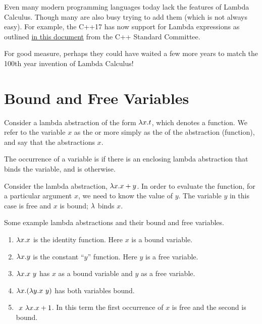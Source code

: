 \begin{note}
\label{nt:lce::syn::pl} 
Even many modern programming languages today lack the features of Lambda Calculus.
%
Though many are also busy trying to add them (which is not always easy).
%
For example,
the C++17 has now support for Lambda expressions as outlined 
%
\href{http://www.open-std.org/jtc1/sc22/wg21/docs/papers/2016/p0170r1.pdf}
{in this document}
%
from the C++ Standard Committee.

For good measure, perhaps they could have waited a few more
years to match the 100th year invention of Lambda Calculus!
\end{note}


\section{Bound and Free Variables}
\label{sec:lce::variables}

\begin{definition}
\label{def:lce::binding}
Consider a lambda abstraction of the form $\lambda x. t$, which denotes a
function.
%
We refer to the variable $x$ as the  or more
simply as the  of the abstraction (function),
%
and
%
say that the abstractions  $x$.
%
\end{definition}

\begin{flex}
\begin{definition}
\label{def:lce::bound-and-free}
The occurrence of a variable is  if there is an enclosing
lambda abstraction that binds the variable, and is 
otherwise.
\end{definition}

\begin{example}
Consider the lambda abstraction, $\lambda x. x + y$.  In order to evaluate
the function, for a particular argument $x$, we need to know
the value of $y$.  The variable $y$ in this case is free and $x$
is bound; $\lambda$ binds $x$.  
\end{example}


\begin{example} 
  Some example lambda abstractions and their bound and free variables.
\begin{enumerate}
\item $\lambda x. x$ is the identity function. Here $x$ is a bound variable.
\item $\lambda x. y$ is the constant ``$y$'' function. Here $y$ is a free variable.
\item $\lambda x. x~y$ has $x$ as a bound variable and $y$ as a free variable.
\item $\lambda x. (\lambda y. x~y)$ has both variables bound.
\item $~x~\lambda x. x + 1$.  In this term the first occurrence of $x$ is
  free and the second is bound.
\end{enumerate}
\end{example}
\end{flex}

